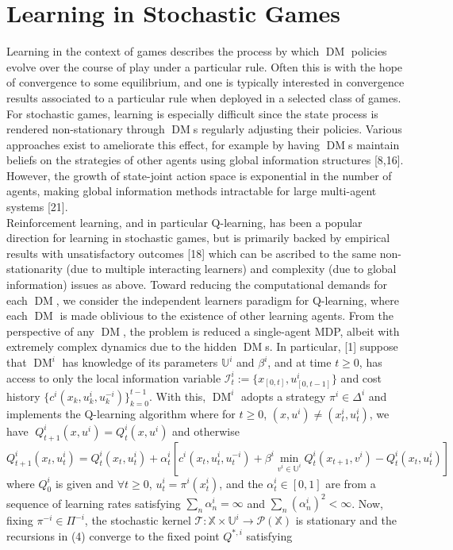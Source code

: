\documentclass[10pt]{article}
\newcommand{\mbb}[1]{\mathbb{#1}}
\newcommand{\1}[1]{\mathbbm{1}_{#1}}
\newcommand{\mc}[1]{\mathcal{#1}}
\DeclareMathOperator{\DM}{DM}
\begin{document}
\section*{Learning in Stochastic Games}
Learning in the context of games describes the process by which $\DM$ policies evolve over the course of play under a particular rule. Often this is with the hope of convergence to some equilibrium, and one is typically interested in convergence results associated to a particular rule when deployed in a selected class of games.
For stochastic games, learning is especially difficult since the state process is rendered non-stationary through $\DM$s regularly adjusting their policies. Various approaches exist to ameliorate this effect, for example by having $\DM$s maintain beliefs on the strategies of other agents using global information structures [8,16].
However, the growth of state-joint action space is exponential in the number of agents, making global information methods intractable for large multi-agent systems [21].\\[5pt]
Reinforcement learning, and in particular Q-learning, has been a popular direction for learning in stochastic games, but is primarily backed by empirical results with unsatisfactory outcomes [18] which can be ascribed to the same non-stationarity (due to multiple interacting learners) and complexity (due to global information) issues as above.
Toward reducing the computational demands for each $\DM$, we consider the independent learners paradigm for Q-learning, where each $\DM$ is made oblivious to the existence of other learning agents. From the perspective of any $\DM$, the problem is reduced a single-agent MDP, albeit with extremely complex dynamics due to the hidden $\DM$s. In particular, [1] suppose that $\DM^i$ has knowledge of its parameters $\mbb{U}^i$ and $\beta^i$, and at time $t\geq 0$, has access to only the local information variable
$\mc{I}^i_t:=\{x_{[0,t]},u^i_{[0,t-1]}\}$ and cost history $\{c^i(x_k,u^i_k,u^{-i}_k)\}_{k= 0}^{t-1}$. With this, $\DM^i$ adopts a strategy $\pi^i\in\Delta^i$ and implements the Q-learning algorithm where for $t\geq 0$, $(x,u^i)\neq(x_t^i,u_t^i)$, we have $\;Q^i_{t+1}(x,u^i)=Q_t^i(x,u^i)$ and otherwise
\[Q_{t+1}^i(x_t,u^i_t)=Q_t^i(x_t,u^i_t)+\alpha^i_t\left[c^i(x_t,u^i_t,u^{-i}_t)+\beta^i\min_{v^i\in\mbb{U}^i}Q^i_t(x_{t+1},v^i)-Q^i_t(x_t,u^i_t)\right]\tag{4}\]
where $Q^i_0$ is given and $\forall t\geq 0$, $u^i_t=\pi^i(x^i_t)$, and the $\alpha^i_{t}\in[0,1]$ are from a sequence of learning rates satisfying $\sum_n\alpha_n^i=\infty$ and $\sum_n(\alpha^i_n)^2<\infty$. Now, fixing $\pi^{-i}\in\Pi^{-i}$, the stochastic kernel $\mc{T}:\mbb{X}\times\mbb{U}^i\rightarrow\mc{P}(\mbb{X})$ is stationary and the recursions in (4) converge to the fixed point $Q^{\ast,i}$ satisfying
\end{document}

